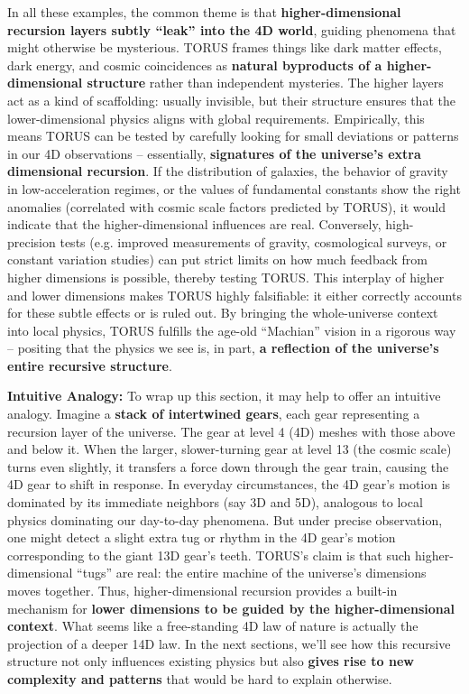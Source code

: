\documentclass[]{article}
\begin{document}
In all these examples, the common theme is that
\textbf{higher-dimensional recursion layers subtly ``leak'' into the 4D
world}, guiding phenomena that might otherwise be mysterious. TORUS
frames things like dark matter effects, dark energy, and cosmic
coincidences as \textbf{natural byproducts of a higher-dimensional
structure} rather than independent mysteries. The higher layers act as a
kind of scaffolding: usually invisible, but their structure ensures that
the lower-dimensional physics aligns with global requirements.
Empirically, this means TORUS can be tested by carefully looking for
small deviations or patterns in our 4D observations -- essentially,
\textbf{signatures of the universe's extra dimensional recursion}. If
the distribution of galaxies, the behavior of gravity in
low-acceleration regimes, or the values of fundamental constants show
the right anomalies (correlated with cosmic scale factors predicted by
TORUS), it would indicate that the higher-dimensional influences are
real. Conversely, high-precision tests (e.g. improved measurements of
gravity, cosmological surveys, or constant variation studies) can put
strict limits on how much feedback from higher dimensions is possible,
thereby testing TORUS. This interplay of higher and lower dimensions
makes TORUS highly falsifiable: it either correctly accounts for these
subtle effects or is ruled out. By bringing the whole-universe context
into local physics, TORUS fulfills the age-old ``Machian'' vision in a
rigorous way -- positing that the physics we see is, in part, \textbf{a
reflection of the universe's entire recursive structure}.

\textbf{Intuitive Analogy:} To wrap up this section, it may help to
offer an intuitive analogy. Imagine a \textbf{stack of intertwined
gears}, each gear representing a recursion layer of the universe. The
gear at level 4 (4D) meshes with those above and below it. When the
larger, slower-turning gear at level 13 (the cosmic scale) turns even
slightly, it transfers a force down through the gear train, causing the
4D gear to shift in response. In everyday circumstances, the 4D gear's
motion is dominated by its immediate neighbors (say 3D and 5D),
analogous to local physics dominating our day-to-day phenomena. But
under precise observation, one might detect a slight extra tug or rhythm
in the 4D gear's motion corresponding to the giant 13D gear's teeth.
TORUS's claim is that such higher-dimensional ``tugs'' are real: the
entire machine of the universe's dimensions moves together. Thus,
higher-dimensional recursion provides a built-in mechanism for
\textbf{lower dimensions to be guided by the higher-dimensional
context}. What seems like a free-standing 4D law of nature is actually
the projection of a deeper 14D law. In the next sections, we'll see how
this recursive structure not only influences existing physics but also
\textbf{gives rise to new complexity and patterns} that would be hard to
explain otherwise.
\end{document}
